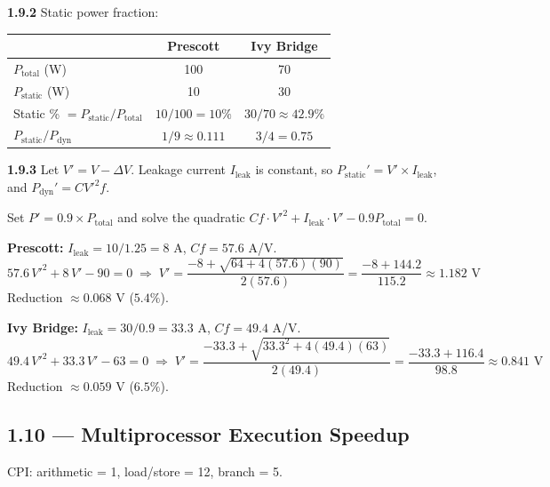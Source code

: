\medskip\noindent\textbf{1.9.2} Static power fraction:

\begin{center}
\begin{tabular}{lcc}
\toprule
& Prescott & Ivy Bridge \\
\midrule
$P_{\text{total}}$ (W)       & 100  & 70 \\
$P_{\text{static}}$ (W)      & 10   & 30 \\
Static \% $=P_{\text{static}}/P_{\text{total}}$
                              & $10/100 = 10\%$ & $30/70 \approx 42.9\%$ \\
$P_{\text{static}}/P_{\text{dyn}}$ & $1/9 \approx 0.111$ & $3/4 = 0.75$ \\
\bottomrule
\end{tabular}
\end{center}

\medskip\noindent\textbf{1.9.3}
Let $V' = V - \Delta V$.  Leakage current $I_{\text{leak}}$ is constant,
so $P_{\text{static}}' = V' \times I_{\text{leak}}$, and
$P_{\text{dyn}}' = C V'^{2} f$.

Set $P' = 0.9 \times P_{\text{total}}$ and solve the quadratic
$C f \cdot V'^2 + I_{\text{leak}} \cdot V' - 0.9 P_{\text{total}} = 0$.

\textbf{Prescott:} $I_{\text{leak}} = 10/1.25 = 8$ A, $Cf = 57.6$ A/V.
\[
  57.6\,V'^2 + 8\,V' - 90 = 0
  \;\Rightarrow\;
  V' = \frac{-8 + \sqrt{64 + 4(57.6)(90)}}{2(57.6)}
     = \frac{-8 + 144.2}{115.2} \approx 1.182\text{ V}
\]
Reduction $\approx 0.068$ V ($5.4\%$).

\textbf{Ivy Bridge:} $I_{\text{leak}} = 30/0.9 = 33.3$ A, $Cf = 49.4$ A/V.
\[
  49.4\,V'^2 + 33.3\,V' - 63 = 0
  \;\Rightarrow\;
  V' = \frac{-33.3 + \sqrt{33.3^2 + 4(49.4)(63)}}{2(49.4)}
     = \frac{-33.3 + 116.4}{98.8} \approx 0.841\text{ V}
\]
Reduction $\approx 0.059$ V ($6.5\%$).

\subsection*{1.10 --- Multiprocessor Execution Speedup}
\hypertarget{sol-1.10}{}

CPI: arithmetic = 1, load/store = 12, branch = 5.

